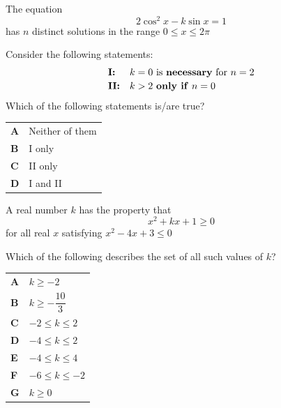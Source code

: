 \documentclass[11pt,a4paper]{article}
\begin{document}
\clearpage
\thispagestyle{djspaper}
\vspace*{8pt}
\begin{enumerate}[label=\textbf{\arabic*.},leftmargin=*,itemsep=0pt,start=9]
\questionitem[Trigonometry]
The equation \[ 2\cos^2 x - k\sin x = 1 \] has $n$ distinct solutions in the range $0 \le x \le 2\pi$

Consider the following statements: \[ \begin{array}{@{}l l@{}}
\textbf{I:} & \text{$k = 0$ is \textbf{necessary} for $n = 2$} \\[2pt]
\textbf{II:} & \text{$k > 2$ \textbf{only if} $n = 0$}
\end{array} \]
Which of the following statements is/are true?

\par\vspace*{12pt}
\begin{tabularx}{\linewidth}{@{}>{\bfseries}l Y@{}}
A &
Neither of them
\\[0.8em]
B &
I only
\\[0.8em]
C &
II only
\\[0.8em]
D &
I and II
\\
\end{tabularx}
\end{enumerate}
\clearpage
\thispagestyle{djspaper}
\vspace*{8pt}
\begin{enumerate}[label=\textbf{\arabic*.},leftmargin=*,itemsep=0pt,start=10]
\questionitem[Inequalities]
A real number $k$ has the property that \[ x^2+kx+1\ge 0 \] for all real $x$ satisfying $x^2-4x+3\le 0$

Which of the following describes the set of all such values of $k$?

\par\vspace*{12pt}
\begin{tabularx}{\linewidth}{@{}>{\bfseries}l Y@{}}
A &
$k\ge -2$
\\[0.8em]
B &
$k\ge -\dfrac{10}{3}$
\\[0.8em]
C &
$-2\le k\le 2$
\\[0.8em]
D &
$-4\le k\le 2$
\\[0.8em]
E &
$-4\le k\le 4$
\\[0.8em]
F &
$-6\le k\le -2$
\\[0.8em]
G &
$k\ge 0$
\\
\end{tabularx}
\end{enumerate}
\end{document}
